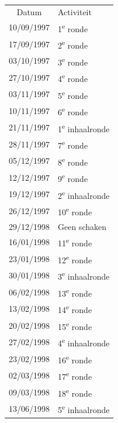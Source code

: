 \documentclass[a4paper]{scrreprt}
\begin{document}
\begin{landscape}
\begin{center}
\begin{tabular}{ c l }
    \rowcolor{headingkleur}
    \color{headingtekstkleur}Datum & \color{headingtekstkleur}Activiteit \\
\rowcolor{headingkleur!25}
    10/09/1997 & 1\textsuperscript{e} ronde \\
    \hline
\rowcolor{headingkleur!25}
    17/09/1997 & 2\textsuperscript{e} ronde \\
    \hline
\rowcolor{headingkleur!25}
    03/10/1997 & 3\textsuperscript{e} ronde \\
    \hline
\rowcolor{headingkleur!25}
    27/10/1997 & 4\textsuperscript{e} ronde \\
    \hline
\rowcolor{headingkleur!25}
    03/11/1997 & 5\textsuperscript{e} ronde \\
    \hline
\rowcolor{headingkleur!25}
    10/11/1997 & 6\textsuperscript{e} ronde \\
    \hline
\rowcolor{headingkleur!10}
    21/11/1997 & 1\textsuperscript{e} inhaalronde \\
    \hline
\rowcolor{headingkleur!25}
    28/11/1997 & 7\textsuperscript{e} ronde \\
    \hline
\rowcolor{headingkleur!25}
    05/12/1997 & 8\textsuperscript{e} ronde \\
    \hline
\rowcolor{headingkleur!25}
    12/12/1997 & 9\textsuperscript{e} ronde \\
    \hline
\rowcolor{headingkleur!10}
    19/12/1997 & 2\textsuperscript{e} inhaalronde \\
    \hline
\rowcolor{headingkleur!25}
    26/12/1997 & 10\textsuperscript{e} ronde \\
    \hline
    29/12/1998 & Geen schaken \\
    \hline
\rowcolor{headingkleur!25}
    16/01/1998 & 11\textsuperscript{e} ronde \\
    \hline
\rowcolor{headingkleur!25}
    23/01/1998 & 12\textsuperscript{e} ronde \\
    \hline
\rowcolor{headingkleur!10}
    30/01/1998 & 3\textsuperscript{e} inhaalronde \\
    \hline
\rowcolor{headingkleur!25}
    06/02/1998 & 13\textsuperscript{e} ronde \\
    \hline
\rowcolor{headingkleur!25}
    13/02/1998 & 14\textsuperscript{e} ronde \\
    \hline
\rowcolor{headingkleur!25}
    20/02/1998 & 15\textsuperscript{e} ronde \\
    \hline
\rowcolor{headingkleur!10}
    27/02/1998 & 4\textsuperscript{e} inhaalronde \\
    \hline
\rowcolor{headingkleur!25}
    23/02/1998 & 16\textsuperscript{e} ronde \\
    \hline
\rowcolor{headingkleur!25}
    02/03/1998 & 17\textsuperscript{e} ronde \\
    \hline
\rowcolor{headingkleur!25}
    09/03/1998 & 18\textsuperscript{e} ronde \\
    \hline
\rowcolor{headingkleur!10}
    13/06/1998 & 5\textsuperscript{e} inhaalronde \\
    \hline
   \end{tabular}
  \end{center}
 \end{landscape}
\end{document}
